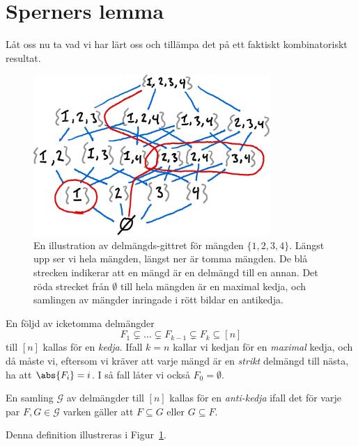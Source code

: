 \documentclass[nobib]{tufte-handout}
\begin{document}
\section{Sperners lemma}

Låt oss nu ta vad vi har lärt oss och tillämpa det på ett faktiskt kombinatoriskt resultat.

\begin{figure}
    \centering
    \includegraphics[width=0.8\textwidth]{F10/subset_lattice_w_chain_and_antichain.png}
    \caption{En illustration av delmängds-gittret för mängden $\{1,2,3,4\}$. Längst upp ser vi hela mängden, längst ner är tomma mängden. De blå strecken indikerar att en mängd är en delmängd till en annan. Det röda strecket från $\emptyset$ till hela mängden är en maximal kedja, och samlingen av mängder inringade i rött bildar en antikedja.}
    \label{fig:chain_and_antichain}
\end{figure}

\begin{definition}
    En följd av icketomma delmängder
    $$F_1 \subsetneq \ldots \subsetneq F_{k-1} \subsetneq F_k \subseteq [n]$$
    till $[n]$ kallas för en \emph{kedja}. Ifall $k=n$ kallar vi kedjan för en \emph{maximal} kedja, och då måste vi, eftersom vi kräver att varje mängd är en \emph{strikt} delmängd till nästa, ha att $\abs{F_i} = i$. I så fall låter vi också $F_0 = \emptyset$.

    En samling $\mathcal{G}$ av delmängder till $[n]$ kallas för en \emph{anti-kedja} ifall det för varje par $F, G \in \mathcal{G}$ varken gäller att $F \subseteq G$ eller $G \subseteq F$.

    Denna definition illustreras i Figur~\ref{fig:chain_and_antichain}.
\end{definition}
\end{document}
